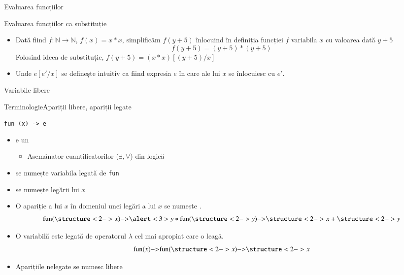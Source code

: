 \documentclass[xcolor=pdftex,romanian,colorlinks]{beamer}
\begin{document}
\begin{section}{Evaluarea funcțiilor}
\begin{frame}{Evaluarea funcțiilor ca substituție}
\begin{itemize}
\item Dată fiind $f : \mathbb{N} \longrightarrow \mathbb{N}$, $f(x) = x * x$, simplificăm  $f(y+5)$  înlocuind în definiția funcției $f$ variabila $x$ cu valoarea dată $y+5$
\[f(y + 5) = (y + 5) * (y + 5)\] 
\vitem Folosind ideea de substituție, $f(y + 5) = (x * x)[(y + 5) / x]$
\item Unde $e[e' / x]$ se definește \alert{intuitiv} ca fiind expresia $e$ în care  ale lui $x$ se înlocuiesc cu $e'$.
\end{itemize}
\end{frame}
\begin{subsection}{Variabile libere}
\begin{frame}[fragile]{Terminologie}{Apariții libere, apariții legate}
\begin{block}{ \lstinline$fun (x) -> e$}
\begin{itemize}
\item {} e un 
\begin{itemize}
\item Asemănator cuantificatorilor ($\exists, \forall$) din logică
\end{itemize}
\item {} se numește variabila legată de \lstinline$fun$
\item {} se numește  legării lui $x$
\item O apariție a lui $x$ în domeniul unei legări a lui $x$ se numește .
\[\fun{\structure<2->{x}}{\alert<3>{y} * \fun{\structure<2->{y}}{\structure<2->{x} + \structure<2->{y}}}\]
\item O variabilă este legată de operatorul $\lambda$ cel mai apropiat care o leagă.
\[\fun{x}{\fun{\structure<2->{x}}{\structure<2->{x}}}\]
\item Aparițiile nelegate se numesc \alert{libere}
\end{itemize}
\end{block}
\end{frame}


\end{subsection}
\end{section}
\end{document}
